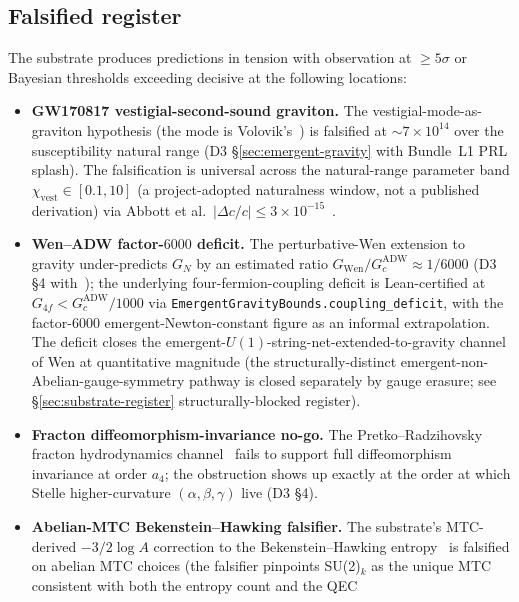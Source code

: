 \documentclass[aps,prd,reprint,nofootinbib,superscriptaddress]{revtex4-2}
\begin{document}
\subsection{Falsified register}

The substrate produces predictions in tension with observation at
$\geq 5\sigma$ or Bayesian thresholds exceeding decisive at the
following locations:

\begin{itemize}
\item \textbf{GW170817 vestigial-second-sound graviton.} The
  vestigial-mode-as-graviton hypothesis (the mode is
  Volovik's~\cite{Volovik2024Vestigial}) is falsified at $\sim 7\times
  10^{14}$ over the susceptibility natural range (D3
  \S\ref{sec:emergent-gravity} with Bundle~L1 PRL splash). The
  falsification is universal across the natural-range parameter band
  $\chi_{\mathrm{vest}}\in[0.1,10]$ (a project-adopted naturalness
  window, not a published derivation) via Abbott et al.\
  $|\Delta c/c| \le 3\times 10^{-15}$~\cite{Abbott2017GW170817}.
\item \textbf{Wen--ADW factor-$6000$ deficit.} The
  perturbative-Wen extension to gravity under-predicts $G_N$ by an
  estimated ratio $G_{\mathrm{Wen}}/G_c^{\mathrm{ADW}} \approx
  1/6000$ (D3 \S 4 with~\cite{Wen2003}); the
  underlying four-fermion-coupling deficit is Lean-certified at
  $G_{4f} < G_c^{\mathrm{ADW}}/1000$ via
  \texttt{EmergentGravityBounds.coupling\_deficit}, with the
  factor-6000 emergent-Newton-constant figure as an informal
  extrapolation. The deficit closes the
  emergent-$U(1)$-string-net-extended-to-gravity channel of Wen at
  quantitative magnitude (the structurally-distinct
  emergent-non-Abelian-gauge-symmetry pathway is closed separately
  by gauge erasure; see \S\ref{sec:substrate-register} structurally-blocked
  register).
\item \textbf{Fracton diffeomorphism-invariance no-go.} The
  Pretko--Radzihovsky fracton hydrodynamics
  channel~\cite{PretkoRadzihovsky2018} fails to support full
  diffeomorphism invariance at order $a_4$; the obstruction shows up
  exactly at the order at which Stelle higher-curvature
  $(\alpha,\beta,\gamma)$ live (D3 \S 4).
\item \textbf{Abelian-MTC Bekenstein--Hawking falsifier.} The
  substrate's MTC-derived $-3/2 \log A$ correction to the
  Bekenstein--Hawking entropy~\cite{KaulMajumdar2000} is falsified
  on abelian MTC choices (the falsifier pinpoints SU(2)$_k$ as the
  unique MTC consistent with both the entropy count and the QEC

\end{itemize}
\end{document}
